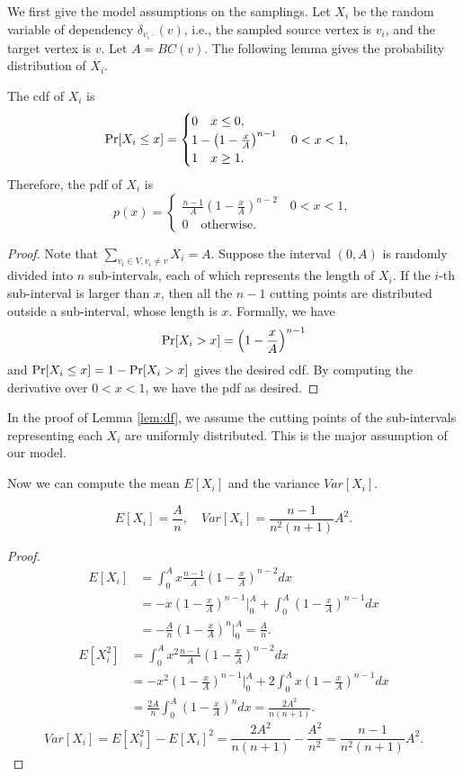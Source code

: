 \documentclass[10pt]{article}
\begin{document}
We first give the model assumptions on the samplings. Let $X_i$ be the random variable of dependency $\delta_{v_i\cdot}(v)$, i.e., the sampled source vertex is $v_i$, and the target vertex is $v$. Let $A=BC(v)$. The following lemma gives the probability distribution of $X_i$.
\begin{lemma}
\label{lem:df}
The cdf of $X_i$ is
$$\mathrm{Pr} [X_i\leq x] = 
\begin{cases}
0 \quad x\leq 0, \\
1-\left( 1-\frac{x}{A} \right)^{n-1}\quad 0<x<1,\\
1 \quad x\geq 1.
\end{cases}$$
Therefore, the pdf of $X_i$ is
$$p(x) =
\begin{cases}
\frac{n-1}{A} \left( 1-\frac{x}{A} \right)^{n-2} \quad 0<x<1,\\
0 \quad \mathrm{otherwise}.
\end{cases}$$
\end{lemma}
\begin{proof}
Note that $\sum_{v_i\in V, v_i\not= v}X_i = A$. Suppose the interval $(0, A)$ is randomly divided into $n$ sub-intervals, each of which represents the length of $X_i$. If the $i$-th sub-interval is larger than $x$, then all the $n-1$ cutting points are distributed outside a sub-interval, whose length is $x$. Formally, we have
$$\mathrm{Pr} [X_i>x] = \left( 1-\frac{x}{A} \right)^{n-1}$$
and $\mathrm{Pr} [X_i\leq x] = 1-\mathrm{Pr} [X_i>x]$ gives the desired cdf. By computing the derivative over $0<x<1$, we have the pdf as desired.
\end{proof}
In the proof of Lemma \ref{lem:df}, we assume the cutting points of the sub-intervals representing each $X_i$ are uniformly distributed. This is the major assumption of our model.

Now we can compute the mean $E[X_i]$ and the variance $Var[X_i]$.
\begin{corollary}
\label{cor:ev}
$$E[X_i] = \frac{A}{n}, \quad Var[X_i] = \frac{n-1}{n^2(n+1)}A^2.$$
\end{corollary}
\begin{proof}
$$
\begin{aligned}
E[X_i] &= \int_0^A x\frac{n-1}{A} \left( 1-\frac{x}{A} \right)^{n-2} dx \\
&= -x\left( 1-\frac{x}{A}\right)^{n-1}\bigg|_0^A + \int_0^A \left( 1-\frac{x}{A}\right)^{n-1} dx \\
&= -\frac{A}{n} \left( 1-\frac{x}{A} \right)^n\bigg|_0^A = \frac{A}{n}.
\end{aligned}
$$
$$
\begin{aligned}
E[X_i^2] &= \int_0^A x^2\frac{n-1}{A} \left( 1-\frac{x}{A} \right)^{n-2} dx \\
&= -x^2\left( 1-\frac{x}{A}\right)^{n-1}\bigg|_0^A + 2\int_0^A x\left( 1-\frac{x}{A}\right)^{n-1} dx \\
&= \frac{2A}{n}\int_0^A \left( 1-\frac{x}{A}\right)^{n} dx = \frac{2A^2}{n(n+1)}.
\end{aligned}
$$
$$Var[X_i] = E[X_i^2] - E[X_i]^2 = \frac{2A^2}{n(n+1)} - \frac{A^2}{n^2} = \frac{n-1}{n^2(n+1)}A^2.$$
\end{proof}
\end{document}

